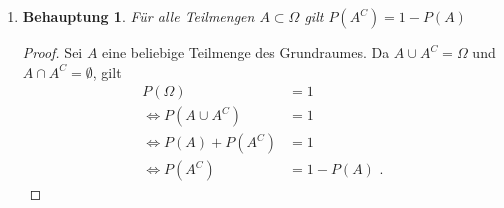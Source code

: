 \documentclass[a4paper]{scrartcl}
\newtheorem*{behaupt}{Behauptung}
\newcommand{\gdw}{\Leftrightarrow}
\begin{document}
\begin{enumerate}[label=\bfseries\arabic*.]
\begin{enumerate}[label=(\roman*)]
\begin{proof}[Beweis durch vollständige Induktion]
                    \textbf{Induktionsschritt} \\
                    Angenommen, es gelte die Behauptung für ein festes
                    $k \in  \mathbb{N}$.
                    \begin{equation}
                        \begin{split}
                            P \left( \bigcup_{i=1}^{k+1} A_i \right)
                            &= P \left( \left( \bigcup_{i=1}^k A_i \right)
                            \cup A_{k+1} \right) \\
                            \gdw P \left( \bigcup_{i=1}^{k+1} A_i \right)
                            &= P \left( \bigcup_{i=1}^k A_i \right) + P (A_{k+1})
                            \qquad \text{(da }\bigcup_{i=1}^{k} A_i \text{ und } A_{k+1} \text{ disjunkt)} \\
                            \gdw P \left( \bigcup_{i=1}^{k+1} A_i \right)
                            &\stackrel{I.A.}{=} \left( \sum_{i=1}^k P(A_i) \right)
                            + P (A_{k+1}) \\
                            \gdw P \left( \bigcup_{i=1}^{k+1} A_i \right)
                            &= \sum_{i=1}^{k+1} P(A_i)
                        \end{split}
                    \end{equation}
                    Dann gilt die Behauptung auch für $k+1$ und nach
                    vollständiger Induktion für alle $n \in \mathbb{N}$.
                    
                    
                \end{proof}

            \item
                \begin{behaupt}
                    Für alle Teilmengen $A \subset \Omega$ gilt
                    $P(A^C) = 1 - P(A)$
                \end{behaupt}
                \begin{proof}
                    Sei $A$ eine beliebige Teilmenge des Grundraumes.
                    Da $A \cup A^C = \Omega$ und $A \cap A^C = \emptyset$, gilt
                    \begin{equation}
                        \begin{split}
                            P(\Omega) &= 1 \\
                            \gdw P(A \cup A^C) &= 1 \\
                            \gdw P(A) + P(A^C) &= 1 \\
                            \gdw P(A^C) &= 1 - P(A) \text{ .}
                        \end{split}
                    \end{equation}
                \end{proof}


\end{enumerate}
\end{enumerate}
\end{document}
